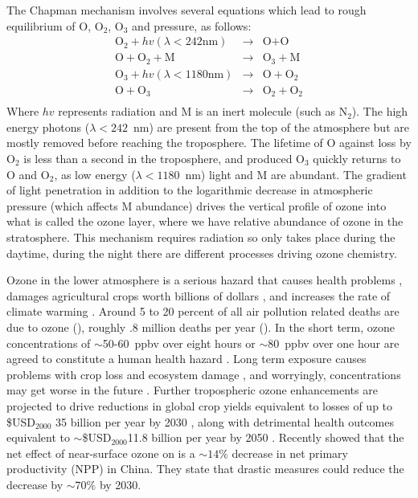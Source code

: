   The Chapman mechanism involves several equations which lead to rough equilibrium of O, O$_2$, O$_3$ and pressure, as follows:
  \begin{equation}
  \begin{aligned}
  \textrm{O}_2 + hv(\lambda < 242 \text{nm}) & \rightarrow & \text{O} + \text{O} \\
  \text{O} + \text{O}_2 + \text{M} & \rightarrow & \text{O}_3 + \text{M} \\
  \text{O}_3 + hv(\lambda < 1180 \text{nm}) & \rightarrow & \text{O} + \text{O}_2 \\
  \text{O} + \text{O}_3 & \rightarrow & \text{O}_2 + \text{O}_2 \\
  \end{aligned}
  \label{LR:O3:eqn_Chapman}
  \end{equation}
  Where $hv$ represents radiation and M is an inert molecule (such as N$_2$).
  The high energy photons ($\lambda < 242$~nm) are present from the top of the atmosphere but are mostly removed before reaching the troposphere.
  The lifetime of O against loss by O$_2$ is less than a second in the troposphere, and produced O$_3$ quickly returns to O and O$_2$, as low energy ($\lambda < 1180$~nm) light and M are abundant.
  The gradient of light penetration in addition to the logarithmic decrease in atmospheric pressure (which affects M abundance) drives the vertical profile of ozone into what is called the ozone layer, where we have relative abundance of ozone in the stratosphere.
  This mechanism requires radiation so only takes place during the daytime, during the night there are different processes driving ozone chemistry.
  
  Ozone in the lower atmosphere is a serious hazard that causes health problems \citep{Hsieh2013}, damages agricultural crops worth billions of dollars \citep{Avnery2011,Yue2017}, and increases the rate of climate warming \citep{IPCC_2013_chap8}.
  Around 5 to 20 percent of all air pollution related deaths are due to ozone (\cite{Monks2015}), roughly .8 million deaths per year (\cite{Lelieveld2013}).
  In the short term, ozone concentrations of $\sim$50-60~ppbv over eight hours or $\sim$80~ppbv over one hour are agreed to constitute a human health hazard \citep{Ayers2006,Lelieveld2009}. 
  Long term exposure causes problems with crop loss and ecosystem damage \citep{Emberson2003}, and worryingly, concentrations may get worse in the future \citep{Lelieveld2009, Stevenson2013}.
  Further tropospheric ozone enhancements are projected to drive reductions in global crop yields equivalent to losses of up to \$USD$_{2000}$ 35 billion per year by 2030 \citep{Avnery2011}, along with detrimental health outcomes equivalent to $\sim$\$USD$_{2000}$11.8 billion per year by 2050 \citep{Selin2009}.
  Recently \cite{Yue2017} showed that the net effect of near-surface ozone on is a $\sim 14\%$ decrease in net primary productivity (NPP) in China.
  They state that drastic measures could reduce the decrease by $\sim 70\%$ by 2030.
  
